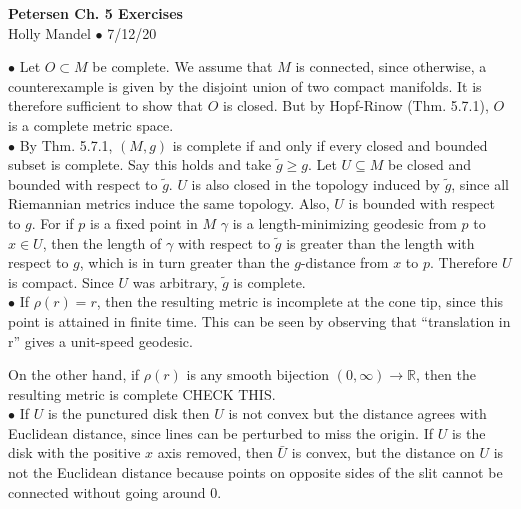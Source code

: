 \documentclass[10pt,letter]{article}
\begin{document}
\begin{center} 
{\bf Petersen Ch. 5 Exercises} \\
Holly Mandel $\bullet$ 7/12/20
\end{center}
 $\bullet$ Let $O \subset M$ be complete. We assume that $M$ is connected, since otherwise, a counterexample is given by the disjoint union of two compact manifolds. It is therefore sufficient to show that $O$ is closed. But by Hopf-Rinow (Thm. 5.7.1), $O$ is a complete metric space. \\

 $\bullet$ By Thm. 5.7.1, $(M,g)$ is complete if and only if every closed and bounded subset is complete. Say this holds and take $\tilde{g} \geq g$. Let $U \subseteq M$ be closed and bounded with respect to $\tilde{g}$. $U$ is also closed in the topology induced by $\tilde{g}$, since all Riemannian metrics induce the same topology. Also, $U$ is bounded with respect to $g$. For if $p$ is a fixed point in $M$ $\gamma$ is a length-minimizing geodesic from $p$ to $x \in U$, then the length of $\gamma$ with respect to $\tilde{g}$ is greater than the length with respect to $g$, which is in turn greater than the $g$-distance from $x$ to $p$.  Therefore $U$ is compact. Since $U$ was arbitrary, $\tilde{g}$ is complete. \\ 
 
 $\bullet$ If $\rho(r) = r$, then the resulting metric is incomplete at the cone tip, since this point is attained in finite time. This can be seen by observing that ``translation in r'' gives a unit-speed geodesic. 

On the other hand, if $\rho(r)$ is any smooth bijection $(0,\infty) \rightarrow \mathbb{R}$, then the resulting metric is complete CHECK THIS. \\

 $\bullet$ If $U$ is the punctured disk then $U$ is not convex but the distance agrees with Euclidean distance, since lines can be perturbed to miss the origin. If $U$ is the disk with the positive $x$ axis removed, then $\bar{U}$ is convex, but the distance on $U$ is not the Euclidean distance because points on opposite sides of the slit cannot be connected without going around $0$. \\
\end{document}
